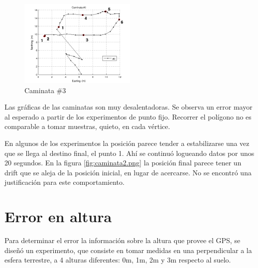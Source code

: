\documentclass[main]{subfiles}
\begin{document}
\begin{figure}
  \begin{center}
\vspace{-30pt}
    \includegraphics[width=0.5\textwidth]{./pics_gps/caminata3.png}
  \end{center}
\vspace{-20pt}
  \caption{Caminata \#3}
  \label{fig:caminata3}
\vspace{-10pt}
\end{figure}

Las gráficas de las caminatas son muy desalentadoras. Se observa un error mayor al esperado a partir de los experimentos de punto fijo. Recorrer el pol\'igono no es comparable a tomar muestras, quieto, en cada v\'ertice.

En algunos de los experimentos la posición parece tender a estabilizarse una vez que se llega al destino final, el punto 1. Ahí se continuó logueando datos por unos 20 segundos. En la figura \ref{fig:caminata2.png} la posición final parece tener un drift que se aleja de la posición inicial, en lugar de acercarse. No se encontró una justificación para este comportamiento.

\section{Error en altura}
\label{sec:error-en-altura}

Para determinar el error la información sobre la altura que provee el GPS, se dise\~nó un experimento, que consiste en tomar medidas en una perpendicular a la esfera terrestre, a 4 alturas diferentes: 0m, 1m, 2m y 3m respecto al suelo.
\end{document}
